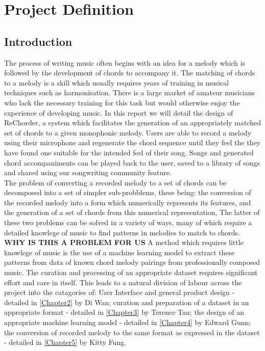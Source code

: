 
\chapter{Project Definition} %

\label{Chapter1} %


\section{Introduction}

The process of writing music often begins with an idea for a melody which is followed by the development of chords to accompany it.
The matching of chords to a melody is a skill which usually requires years of training in musical techniques such as harmonisation.
There is a large market of amateur musicians who lack the necessary training for this task but would otherwise enjoy the experience of developing music.  
In this report we will detail the design of ReChorder, a system which facilitates the generation of an appropriately matched set of chords to a given monophonic melody. \label{Chap1Sec1}
Users are able to record a melody using their microphone and regenerate the chord sequence until they feel the they have found one suitable for the intended feel of their song.
Songs and generated chord accompaniments can be played back to the user, saved to a library of songs and shared using our songwriting community feature. \\
The problem of converting a recorded melody to a set of chords can be decomposed into a set of simpler sub-probblems, these being:
the conversion of the recorded melody into a form which numerically represents its features,
and the generation of a set of chords from this numerical representation,
The latter of these two problems can be solved in a variety of ways, many of which require a detailed knowlege of music to find patterns in melodies to match to chords.  
\textbf{WHY IS THIS A PROBLEM FOR US}
A method which requires little knowlege of music is the use of a machine learning model to extract these patterns from data of known chord melody pairings from professionally composed music. 
The curation and processing of an appropriate dataset requires significant effort and care in itself.
This leads to a natural division of labour across the project into the catagories of:
\label{sec:Introduction}
User Interface and general product design - detailed in \ref{Chapter2} by Di Wan;
curation and preparation of a dataset in an appropriate format - detailed in \ref{Chapter3} by Terence Tan;
the design of an appropriate machine learning model - detailed in \ref{Chapter4} by Edward Gunn;
the conversion of recorded melody to the same format as expressed in the dataset - detailed in \ref{Chapter5} by Kitty Fung.


